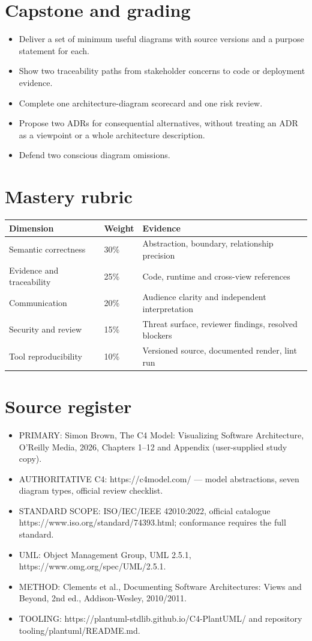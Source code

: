 \documentclass[10pt,letterpaper]{article}
\begin{document}
\section{Capstone and grading}
\begin{itemize}
\item Deliver a set of minimum useful diagrams with source versions and a purpose statement for each.
\item Show two traceability paths from stakeholder concerns to code or deployment evidence.
\item Complete one architecture-diagram scorecard and one risk review.
\item Propose two ADRs for consequential alternatives, without treating an ADR as a viewpoint or a whole architecture description.
\item Defend two conscious diagram omissions.
\end{itemize}

\section{Mastery rubric}
\begin{tabularx}{\linewidth}{@{}YYY@{}}\toprule
\textbf{Dimension} & \textbf{Weight} & \textbf{Evidence} \\ \midrule
Semantic correctness & 30\% & Abstraction, boundary, relationship precision \\
Evidence and traceability & 25\% & Code, runtime and cross-view references \\
Communication & 20\% & Audience clarity and independent interpretation \\
Security and review & 15\% & Threat surface, reviewer findings, resolved blockers \\
Tool reproducibility & 10\% & Versioned source, documented render, lint run \\
\bottomrule\end{tabularx}


\section{Source register}
\begin{itemize}
\item PRIMARY: Simon Brown, The C4 Model: Visualizing Software Architecture, O’Reilly Media, 2026, Chapters 1–12 and Appendix (user-supplied study copy).
\item AUTHORITATIVE C4: https://c4model.com/ — model abstractions, seven diagram types, official review checklist.
\item STANDARD SCOPE: ISO/IEC/IEEE 42010:2022, official catalogue https://www.iso.org/standard/74393.html; conformance requires the full standard.
\item UML: Object Management Group, UML 2.5.1, https://www.omg.org/spec/UML/2.5.1.
\item METHOD: Clements et al., Documenting Software Architectures: Views and Beyond, 2nd ed., Addison-Wesley, 2010/2011.
\item TOOLING: https://plantuml-stdlib.github.io/C4-PlantUML/ and repository tooling/plantuml/README.md.
\end{itemize}
\end{document}
